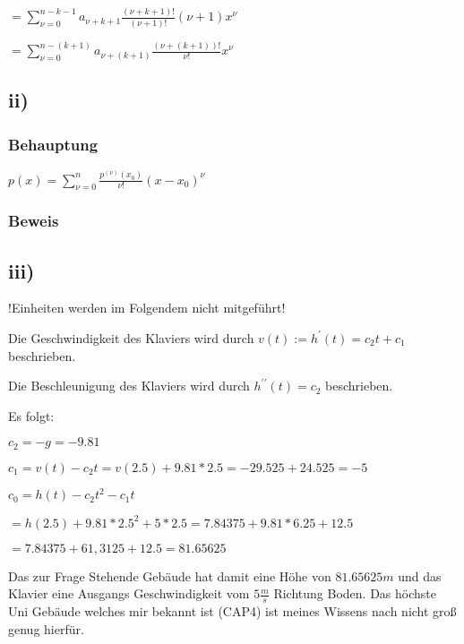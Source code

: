 $ = \sum\limits^{n-k-1}_{\nu=0} a_{\nu+k+1} \frac{(\nu+k+1)!}{(\nu+1)!} (\nu+1)x^{\nu}$

$ = \sum\limits^{n -(k+1)}_{\nu=0} a_{\nu+(k+1)} \frac{(\nu+(k+1))!}{\nu!} x^{\nu}$

\subsection*{ii)}

\subsubsection*{Behauptung}

$p(x) = \sum\limits^{n}_{\nu = 0} \frac{p^{(\nu)}(x_{0})}{\nu!} (x-x_{0})^{\nu}$

\subsubsection*{Beweis}


\subsection*{iii)}

\begin{large}
!Einheiten werden im Folgendem nicht mitgeführt!
\end{large}

Die Geschwindigkeit des Klaviers wird durch $v(t) := h^{\prime}(t) = c_{2}t + c_{1}$ beschrieben.

Die Beschleunigung des Klaviers wird durch $h^{\prime\prime}(t) = c_{2}$ beschrieben.

Es folgt:

$c_{2} = -g = -9.81$

$c_{1} = v(t) - c_{2}t = v(2.5) + 9.81*2.5 = -29.525 + 24.525 = -5$

$c_{0} = h(t) - c_{2}t^{2} - c_{1}t$

$= h(2.5) + 9.81 * 2.5^{2} + 5 * 2.5 = 7.84375 + 9.81 * 6.25 + 12.5$
 
$ = 7.84375 + 61,3125 + 12.5 = 81.65625$

Das zur Frage Stehende Gebäude hat damit eine Höhe von $81.65625m$ und das Klavier eine Ausgangs Geschwindigkeit vom $5\frac{m}{s}$ Richtung Boden.
Das höchste Uni Gebäude welches mir bekannt ist (CAP4) ist meines Wissens nach nicht groß genug hierfür.
       
 